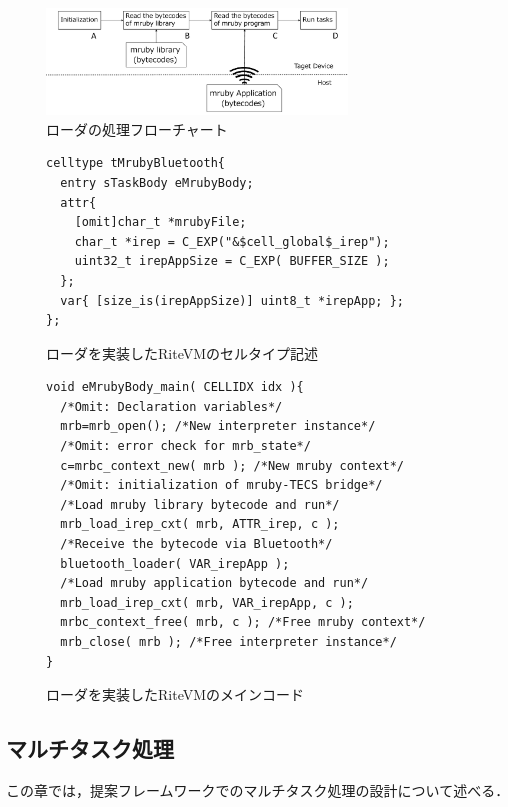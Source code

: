 \documentclass[submit,techrep]{ipsj}
\begin{document}
\begin{figure}[t]
    \centering
    \includegraphics[width=8cm,clip]{../EMSOFT2016/figure/control_flow.pdf}
    \vspace{-2mm}
    \caption{ローダの処理フローチャート}
\vspace{-5mm}
    \label{fig:control_flow}
\end{figure}
\begin{figure}[t]
\centering
\begin{lstlisting}
celltype tMrubyBluetooth{
  entry sTaskBody eMrubyBody;
  attr{
    [omit]char_t *mrubyFile;
    char_t *irep = C_EXP("&$cell_global$_irep");
    uint32_t irepAppSize = C_EXP( BUFFER_SIZE );
  };
  var{ [size_is(irepAppSize)] uint8_t *irepApp; };
};
\end{lstlisting}
    \vspace{-2mm}
\caption{ローダを実装したRiteVMのセルタイプ記述}
\vspace{-4mm}
\label{celltype_mrubybluetooth}
\end{figure}
\begin{figure}[t]
\centering
\begin{lstlisting}
void eMrubyBody_main( CELLIDX idx ){
  /*Omit: Declaration variables*/
  mrb=mrb_open(); /*New interpreter instance*/
  /*Omit: error check for mrb_state*/
  c=mrbc_context_new( mrb ); /*New mruby context*/
  /*Omit: initialization of mruby-TECS bridge*/
  /*Load mruby library bytecode and run*/
  mrb_load_irep_cxt( mrb, ATTR_irep, c );
  /*Receive the bytecode via Bluetooth*/
  bluetooth_loader( VAR_irepApp );
  /*Load mruby application bytecode and run*/
  mrb_load_irep_cxt( mrb, VAR_irepApp, c );
  mrbc_context_free( mrb, c ); /*Free mruby context*/
  mrb_close( mrb ); /*Free interpreter instance*/
}

\end{lstlisting}
    \vspace{-2mm}
\caption{ローダを実装したRiteVMのメインコード}
\vspace{-3mm}
\label{maincode_mrubybluetooth}
\end{figure} 
\vspace{-5mm}
\subsection{マルチタスク処理}
\label{sec:Multitask}
この章では，提案フレームワークでのマルチタスク処理の設計について述べる．
\end{document}
